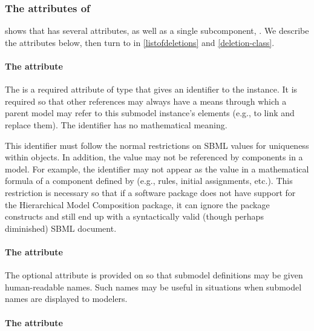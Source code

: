 \subsubsection{The attributes of }

 shows that \Submodel has several attributes, as well as a single subcomponent, .  We describe the attributes below, then turn to  in \ref{listofdeletions} and \ref{deletion-class}.


\paragraph{The \fixttspace{} attribute}

The  is a required attribute of type  that gives an identifier to the \Submodel instance.  It is required so that other references may always have a means through which a parent model may refer to this submodel instance's elements (e.g., to link and replace them).  The identifier has no mathematical meaning.

This identifier must follow the normal restrictions on SBML  values for uniqueness within \Model objects.  In addition, the  value may not be referenced by \sbmlthreecore components in a model.  For example, the identifier may not appear as the  value in a mathematical formula of a component defined by \sbmlthreecore (e.g., rules, initial assignments, etc.). This restriction is necessary so that if a software package does not have support for the Hierarchical Model Composition package, it can ignore the package constructs and still end up with a syntactically valid (though perhaps diminished) SBML document.


\paragraph{The \fixttspace{} attribute}

The optional  attribute is provided on \Submodel so that submodel definitions may be given human-readable names.  Such names may be useful in situations when submodel names are displayed to modelers.


\paragraph{The \fixttspace{} attribute}
\label{submodel-modelref}
  
